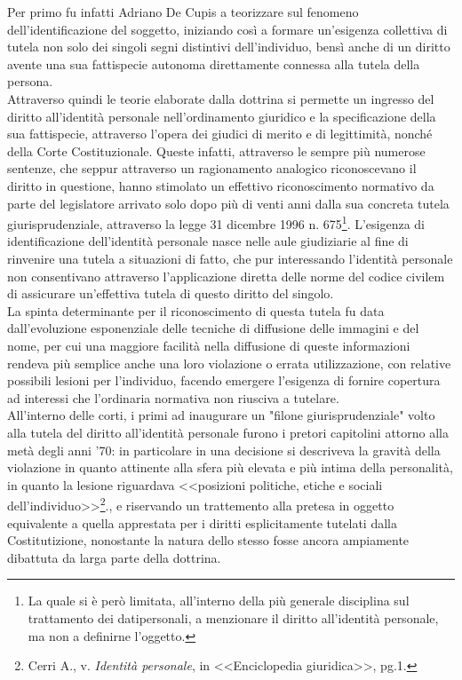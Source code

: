 Per primo fu infatti Adriano De Cupis a teorizzare sul fenomeno dell'identificazione del soggetto, iniziando così a formare un’esigenza collettiva di tutela non solo dei singoli   segni distintivi dell'individuo, bensì anche di un diritto avente una sua fattispecie autonoma direttamente connessa alla tutela della persona. 
\\Attraverso quindi le teorie elaborate dalla dottrina si permette un ingresso del diritto all’identità personale nell’ordinamento giuridico e la specificazione della sua fattispecie, attraverso l’opera dei giudici di merito e di legittimità, nonché della Corte Costituzionale. Queste infatti, attraverso le sempre più numerose sentenze, che seppur attraverso un ragionamento analogico riconoscevano il diritto in questione, hanno stimolato un effettivo riconoscimento normativo da parte del legislatore arrivato solo dopo più di venti anni dalla sua concreta tutela giurisprudenziale, attraverso la legge 31 dicembre 1996 n. 675\footnote{ La quale si è però limitata, all’interno della più generale disciplina sul trattamento dei datipersonali, a menzionare il diritto all’identità personale, ma non a definirne l’oggetto.}.
L’esigenza   di   identificazione dell’identità personale nasce nelle aule giudiziarie al fine di rinvenire una tutela a situazioni di fatto, che pur interessando l’identità personale non consentivano attraverso l'applicazione diretta delle norme del codice   civilem di assicurare un’effettiva tutela di questo diritto del singolo.
\\La spinta determinante per il riconoscimento di questa tutela fu data dall’evoluzione esponenziale delle tecniche di diffusione  delle immagini e del nome, per cui una maggiore facilità nella diffusione di queste informazioni rendeva più semplice anche una loro violazione o errata utilizzazione, con relative possibili lesioni per l'individuo, facendo emergere l’esigenza di fornire copertura ad interessi che l’ordinaria normativa non riusciva a tutelare.
\\All'interno delle corti, i primi ad inaugurare un "filone giurisprudenziale" volto alla tutela del diritto all'identità personale furono i pretori capitolini attorno alla metà degli anni '70: in particolare in una decisione si descriveva la gravità della violazione in quanto attinente alla sfera più elevata e più intima della personalità, in quanto la lesione riguardava <<posizioni politiche, etiche e sociali dell'individuo>>\footnote{Cerri A., v. \textit{Identità personale}, in <<Enciclopedia giuridica>>, pg.1.}., e riservando un trattemento alla pretesa in oggetto equivalente a quella apprestata per i diritti esplicitamente tutelati dalla Costitutizione, nonostante la natura dello stesso fosse ancora ampiamente dibattuta da larga parte della dottrina.
